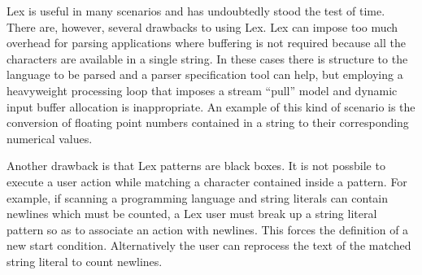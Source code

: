 \documentclass[letterpaper,11pt,oneside]{book}
\begin{document}
Lex is useful in many scenarios and has undoubtedly stood the test of time.
There are, however, several drawbacks to using Lex.  Lex can impose too much
overhead for parsing applications where buffering is not required because all
the characters are available in a single string.  In these cases there is
structure to the language to be parsed and a parser specification tool can
help, but employing a heavyweight processing loop that imposes a stream
``pull'' model and dynamic input buffer allocation is inappropriate.  An
example of this kind of scenario is the conversion of floating point numbers
contained in a string to their corresponding numerical values.

Another drawback is that 
Lex patterns are black boxes. It is not possbile to execute a user action while
matching a character contained inside a pattern. For example, if scanning a
programming language and string literals can contain newlines which must be
counted, a Lex user must break up a string literal pattern so as to associate
an action with newlines. This forces the definition of a new start condition.
Alternatively the user can reprocess the text of the matched string literal to
count newlines. 
\end{document}
